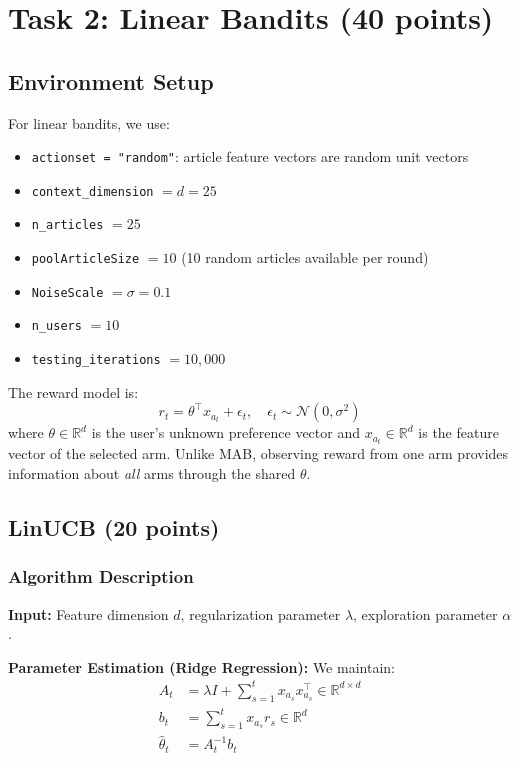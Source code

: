 \documentclass[11pt]{article}
\begin{document}
\section{Task 2: Linear Bandits (40 points)}

\subsection{Environment Setup}

For linear bandits, we use:
\begin{itemize}[noitemsep]
    \item \texttt{actionset = "random"}: article feature vectors are random unit vectors
    \item \texttt{context\_dimension} $= d = 25$
    \item \texttt{n\_articles} $= 25$
    \item \texttt{poolArticleSize} $= 10$ (10 random articles available per round)
    \item \texttt{NoiseScale} $= \sigma = 0.1$
    \item \texttt{n\_users} $= 10$
    \item \texttt{testing\_iterations} $= 10{,}000$
\end{itemize}

The reward model is:
\[
r_t = \theta^\top x_{a_t} + \epsilon_t, \quad \epsilon_t \sim \mathcal{N}(0, \sigma^2)
\]
where $\theta \in \mathbb{R}^d$ is the user's unknown preference vector and $x_{a_t} \in \mathbb{R}^d$ is the feature vector of the selected arm. Unlike MAB, observing reward from one arm provides information about \textit{all} arms through the shared $\theta$.

\subsection{LinUCB (20 points)}

\subsubsection{Algorithm Description}

\textbf{Input:} Feature dimension $d$, regularization parameter $\lambda$, exploration parameter $\alpha$.

\textbf{Parameter Estimation (Ridge Regression):} We maintain:
\begin{align}
A_t &= \lambda I + \sum_{s=1}^{t} x_{a_s} x_{a_s}^\top \in \mathbb{R}^{d \times d} \label{eq:linucb_A} \\
b_t &= \sum_{s=1}^{t} x_{a_s} r_s \in \mathbb{R}^d \label{eq:linucb_b} \\
\hat{\theta}_t &= A_t^{-1} b_t \label{eq:linucb_theta}
\end{align}
\end{document}
